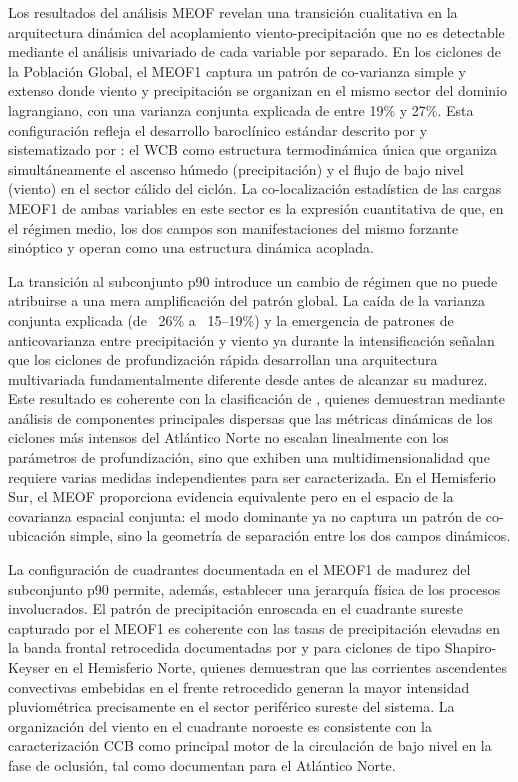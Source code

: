 Los resultados del análisis MEOF revelan una transición cualitativa en la arquitectura dinámica del acoplamiento viento-precipitación que no es detectable mediante el análisis univariado de cada variable por separado. 
En los ciclones de la Población Global, el MEOF1 captura un patrón de co-varianza simple y extenso donde viento y precipitación se organizan en el mismo sector del dominio lagrangiano, con una varianza conjunta explicada de entre 19\% y 27\%. 
Esta configuración refleja el desarrollo baroclínico estándar descrito por \citet{bjerknes1922life} y sistematizado por \citet{browning1986conceptual}: el WCB como estructura termodinámica única que organiza simultáneamente el ascenso húmedo (precipitación) y el flujo de bajo nivel (viento) en el sector cálido del ciclón. 
La co-localización estadística de las cargas MEOF1 de ambas variables en este sector es la expresión cuantitativa de que, en el régimen medio, los dos campos son manifestaciones del mismo forzante sinóptico y operan como una estructura dinámica acoplada.

La transición al subconjunto p90 introduce un cambio de régimen que no puede atribuirse a una mera amplificación del patrón global. 
La caída de la varianza conjunta explicada (de ~26\% a ~15--19\%) y la emergencia de patrones de anticovarianza entre precipitación y viento ya durante la intensificación señalan que los ciclones de profundización rápida desarrollan una arquitectura multivariada fundamentalmente diferente desde antes de alcanzar su madurez.
Este resultado es coherente con la clasificación de \citet{corner2025classification}, quienes demuestran mediante análisis de componentes principales dispersas que las métricas dinámicas de los ciclones más intensos del Atlántico Norte no escalan linealmente con los parámetros de profundización, sino que exhiben una multidimensionalidad que requiere varias medidas independientes para ser caracterizada.
En el Hemisferio Sur, el MEOF proporciona evidencia equivalente pero en el espacio de la covarianza espacial conjunta: el modo dominante ya no captura un patrón de co-ubicación simple, sino la geometría de separación entre los dos campos dinámicos.

La configuración de cuadrantes documentada en el MEOF1 de madurez del subconjunto p90 permite, además, establecer una jerarquía física de los procesos involucrados.
El patrón de precipitación enroscada en el cuadrante sureste capturado por el MEOF1 es coherente con las tasas de precipitación elevadas en la banda frontal retrocedida documentadas por \citet{clark2005sting} y \citet{oertel2021warm} para ciclones de tipo Shapiro-Keyser en el Hemisferio Norte, quienes demuestran que las corrientes ascendentes convectivas embebidas en el frente retrocedido generan la mayor intensidad pluviométrica precisamente en el sector periférico sureste del sistema. 
La organización del viento en el cuadrante noroeste es consistente con la caracterización CCB como principal motor de la circulación de bajo nivel en la fase de oclusión, tal como documentan \citet{eisenstein2023identification} para el Atlántico Norte. 

